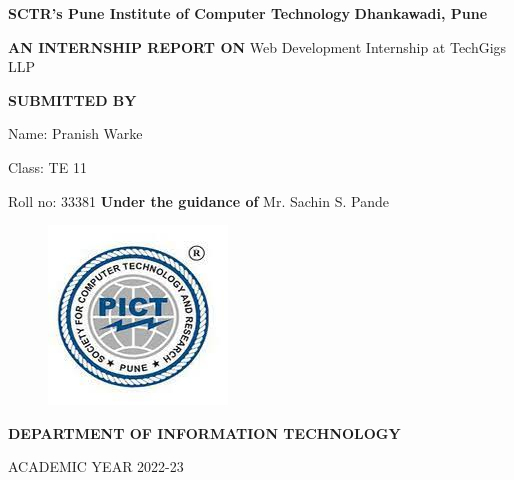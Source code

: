 \documentclass[a4paper, 12pt]{article}
\begin{document}
\begin{titlepage}
\begin{center}
\textbf{\large SCTR's Pune Institute of Computer Technology}
\linebreak
\textbf{\large Dhankawadi, Pune}
\vspace{10 mm}

\textbf {\large AN INTERNSHIP REPORT ON}
\linebreak 
\linebreak 
\Large{Web Development Internship at TechGigs LLP}
\vspace{15 mm}
\linebreak

\textbf{\large{SUBMITTED BY}}

Name: Pranish Warke

Class:  TE 11

Roll no:\hspace{2mm} 33381
\linebreak
\linebreak
\textbf{Under the guidance of}
\linebreak
Mr. Sachin S. Pande
\linebreak
\linebreak 
\linebreak
\begin{figure}[ht!]
\begin{center}
\includegraphics[scale=0.6]{logo.jpg}
\end{center}
\label{overflow}
\end{figure}
\textbf{\linebreak \linebreak  \large{DEPARTMENT OF INFORMATION TECHNOLOGY}}

\large{ACADEMIC YEAR 2022-23}
\end{center}
\end{titlepage}
\end{document}
